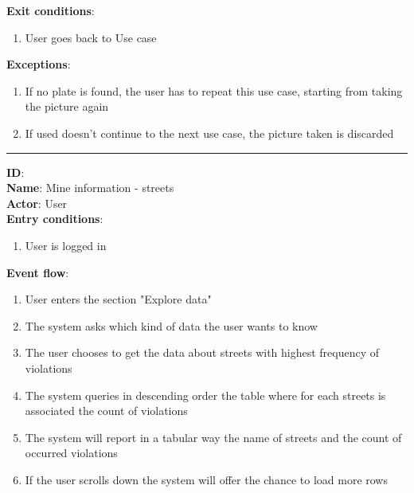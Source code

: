 \begin{enumerate}
\begin{itemize}
\begin{enumerate}
    \end{enumerate}
    \textbf{Exit conditions}:
    \begin{enumerate}
      \item{User goes back to Use case }
    \end{enumerate}
    \textbf{Exceptions}:
    \begin{enumerate}
      \item{If no plate is found, the user has to repeat this use case, starting from taking the picture again}
      \item{If used doesn't continue to the next use case, the picture taken is discarded}
    \end{enumerate}
    \rule{\linewidth}{0.4pt}

		\textbf{ID}:  \\
		\textbf{Name}: Mine information - streets \\
		\textbf{Actor}: User  \\
		\textbf{Entry conditions}:
		\begin{enumerate}
			\item{User is logged in}
		\end{enumerate}
		\textbf{Event flow}:
		\begin{enumerate}
			\item{User enters the section "Explore data"}
			\item{The system asks which kind of data the user wants to know}
      \item{The user chooses to get the data about streets with highest frequency of violations}
      \item{The system queries in descending order the table where for each streets is associated the count of violations }
      \item{The system will report in a tabular way the name of streets and the count of occurred violations}
      \item{If the user scrolls down the system will offer the chance to load more rows}
		\end{enumerate}


\end{itemize}
\end{enumerate}
